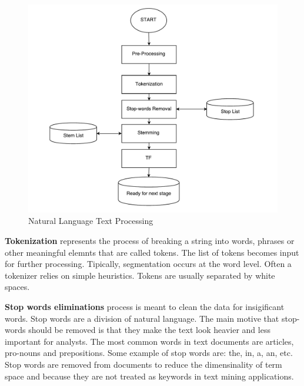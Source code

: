 \begin{figure}[!ht]
\centering
\includegraphics[width=15cm]{textmining}
\caption{Natural Language Text Processing}\label{text}
\end{figure}

\textbf{Tokenization} represents the process of breaking a string into words, phrases or other meaningful elemnts that are called tokens. The list of tokens becomes input for further processing. Tipically, segmentation occurs at the word level. Often a tokenizer relies on simple heuristics. Tokens are usually separated by white spaces. 

\textbf{Stop words eliminations} process is meant to clean the data for insigificant words. Stop words are a division of natural language. The main motive that stop-words should be removed is that they make the text look heavier and less important for analysts. The most common words in text documents are articles, pro-nouns and prepositions. Some example of stop words are: the, in, a, an, etc. Stop words are removed from documents to reduce the dimensinality of term space and because they are not treated as keywords in text mining applications. \cite{sufix}

